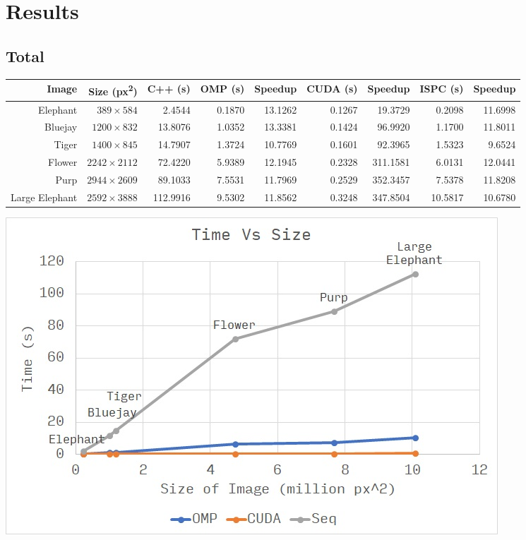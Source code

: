 \documentclass[12pt]{article}
\begin{document}
\section{Results}

\subsection{Total}
\begin{tabular}{r|r|r|r|r|r|r|r|r}
    Image & Size (px\textsuperscript{2}) & C++ (s) & OMP (s) & Speedup & CUDA (s) & Speedup & ISPC (s) & Speedup
\\  \hline
    Elephant & $389 \times 584$ & 2.4544 & 0.1870 & 13.1262 & 0.1267 & 19.3729 & 0.2098 & 11.6998
\\  Bluejay & $1200 \times 832$ & 13.8076 & 1.0352 & 13.3381 & 0.1424 & 96.9920 & 1.1700 & 11.8011
\\  Tiger & $1400 \times 845$ & 14.7907 & 1.3724 & 10.7769 & 0.1601 & 92.3965 & 1.5323 & 9.6524
\\  Flower & $2242 \times 2112$ & 72.4220 & 5.9389 & 12.1945 & 0.2328 & 311.1581 & 6.0131 & 12.0441
\\  Purp & $2944 \times 2609$ & 89.1033 & 7.5531 & 11.7969 & 0.2529 & 352.3457 & 7.5378 & 11.8208
\\  Large Elephant & $2592 \times 3888$ & 112.9916 & 9.5302 & 11.8562 & 0.3248 & 347.8504 & 10.5817 & 10.6780
\end{tabular}

\begin{center}
\includegraphics[scale=1]{time.jpg}
\end{center}
\end{document}
